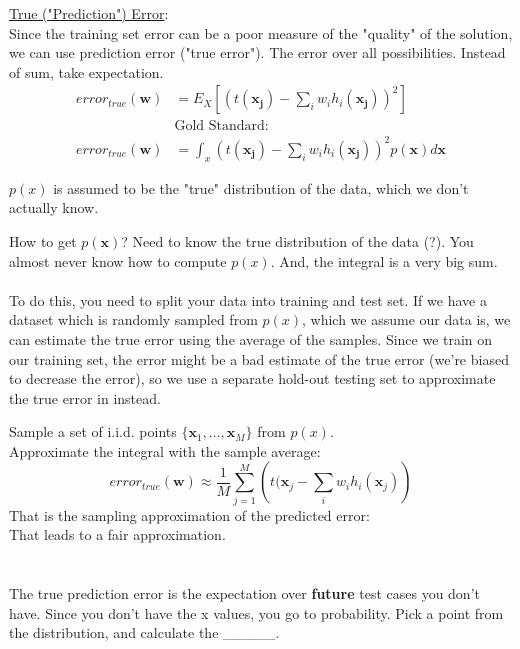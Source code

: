 \underline{True ("Prediction") Error}:   \hfill \\
Since the training set error can be a poor measure of the "quality" of the solution, we can use prediction error ("true error").  
The error over all possibilities.   Instead of sum, take expectation. 
\begin{align*}
	error_{true}(\bm{w}) &= E_X[(t(\bm{x_j})-\sum_{i} w_i h_i(\bm{x_j}))^2] \\
		& \mbox{Gold Standard:} \\
	error_{true}(\bm{w}) &= \int_x (t(\bm{x_j})-\sum_{i} w_i h_i(\bm{x_j}))^2 p(\bm{x}) d\bm{x}
\end{align*}

$p(x)$ is assumed to be the "true" distribution of the data, which we don't actually know. 

How to get $p(\bm{x})$?  Need to know the true distribution of the data (?).  
You almost never know how to compute $p(x)$.
And, the integral is a very big sum. \hfill \\  \hfill \\


To do this, you need to split your data into training and test set. 
If we have a dataset which is randomly sampled from $p(x)$, which we assume our data is, we can estimate the true error using the average of the samples. 
Since we train on our training set, the error might be a bad estimate of the true error (we're biased to decrease the error), so we use a separate hold-out testing set to approximate the true error in instead.

Sample a set of i.i.d. points  $\{ \bm{x}_1, \dots, \bm{x}_M \}$ from $p(x)$.   \hfill \\
Approximate the integral with the sample average:
$$ error_{true}(\bm{w}) \approx \frac{1}{M} \sum_{j=1}^M \left( t(\bm{x}_j - \sum_i w_i h_i(\bm{x}_j) \right) $$
That is the sampling approximation of the predicted error: \hfill \\
That leads to a fair approximation.   \hfill \\

\hfill \\  \hfill \\

The true prediction error is the expectation over \textbf{future} test cases you don't have.  
Since you don't have the x values, you go to probability. 
Pick a point from the distribution, and calculate the \_\_\_\_\_.     \hfill \\  \hfill \\

